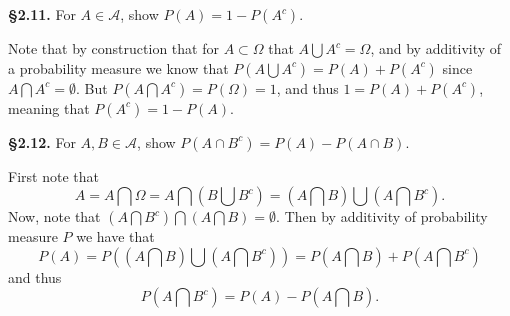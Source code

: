\documentclass[11pt,reqno]{amsart}
\newcommand{\tbox}[2]{\begin{tcolorbox}[colback=white, sharp corners]\textbf{\S#1.} #2 \end{tcolorbox}}
\begin{document}
\tbox{2.11}{ 
    For $A \in \mathcal{A}$, show $P(A) = 1 - P(A^c)$.
}
Note that by construction that for $A \subset \Omega$ that $A \bigcup A^c= \Omega$, and by additivity of a probability measure we know that $P(A\bigcup A^c)=P(A)+P(A^c)$ since $A \bigcap A^c= \emptyset$. 
But $P(A\bigcap A^c) = P(\Omega) = 1$, and thus $1 = P(A) + P(A^c)$, meaning that $P(A^c) = 1 - P(A)$.

\tbox{2.12}{
For $A,B \in \mathcal{A}$, show $P(A \cap B^c) = P(A)-P(A \cap B)$.
}
First note that
$$
    A = A \bigcap \Omega =A\bigcap (B\bigcup B^c)=(A\bigcap B) \bigcup (A\bigcap B^c).
$$ 
Now, note that $(A\bigcap B^c) \bigcap (A\bigcap B) = \emptyset$. 
Then by additivity of probability measure $P$ we have that 
$$
P(A)=P((A\bigcap B) \bigcup (A \bigcap B^c))=P(A \bigcap B) + P( A\bigcap B^c)
$$
and thus 
$$
P(A \bigcap B^c) = P(A)-P(A \bigcap B).
$$
\end{document}
